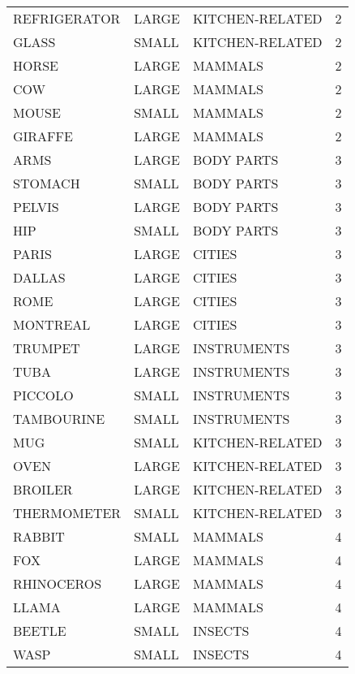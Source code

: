 \begin{tabular}{lllr}
REFRIGERATOR & LARGE &  KITCHEN-RELATED &        2 \\
       GLASS & SMALL &  KITCHEN-RELATED &        2 \\
       HORSE & LARGE &          MAMMALS &        2 \\
         COW & LARGE &          MAMMALS &        2 \\
       MOUSE & SMALL &          MAMMALS &        2 \\
     GIRAFFE & LARGE &          MAMMALS &        2 \\
        ARMS & LARGE &       BODY PARTS &        3 \\
     STOMACH & SMALL &       BODY PARTS &        3 \\
      PELVIS & LARGE &       BODY PARTS &        3 \\
         HIP & SMALL &       BODY PARTS &        3 \\
       PARIS & LARGE &           CITIES &        3 \\
      DALLAS & LARGE &           CITIES &        3 \\
        ROME & LARGE &           CITIES &        3 \\
    MONTREAL & LARGE &           CITIES &        3 \\
     TRUMPET & LARGE &      INSTRUMENTS &        3 \\
        TUBA & LARGE &      INSTRUMENTS &        3 \\
     PICCOLO & SMALL &      INSTRUMENTS &        3 \\
  TAMBOURINE & SMALL &      INSTRUMENTS &        3 \\
         MUG & SMALL &  KITCHEN-RELATED &        3 \\
        OVEN & LARGE &  KITCHEN-RELATED &        3 \\
     BROILER & LARGE &  KITCHEN-RELATED &        3 \\
 THERMOMETER & SMALL &  KITCHEN-RELATED &        3 \\
      RABBIT & SMALL &          MAMMALS &        4 \\
         FOX & LARGE &          MAMMALS &        4 \\
  RHINOCEROS & LARGE &          MAMMALS &        4 \\
       LLAMA & LARGE &          MAMMALS &        4 \\
      BEETLE & SMALL &          INSECTS &        4 \\
        WASP & SMALL &          INSECTS &        4 \\

\end{tabular}
